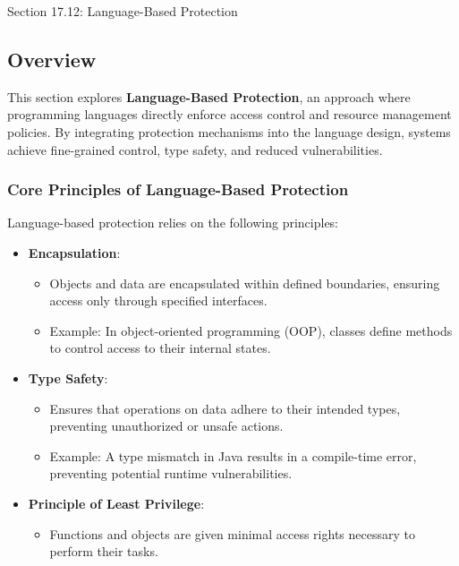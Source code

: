 \begin{notes}{Section 17.12: Language-Based Protection}
    \subsection*{Overview}

    This section explores \textbf{Language-Based Protection}, an approach where programming languages directly enforce access control and resource management policies. By integrating protection 
    mechanisms into the language design, systems achieve fine-grained control, type safety, and reduced vulnerabilities.
    
    \subsubsection*{Core Principles of Language-Based Protection}
    
    Language-based protection relies on the following principles:
    \begin{itemize}
        \item \textbf{Encapsulation}:
        \begin{itemize}
            \item Objects and data are encapsulated within defined boundaries, ensuring access only through specified interfaces.
            \item Example: In object-oriented programming (OOP), classes define methods to control access to their internal states.
        \end{itemize}
        \item \textbf{Type Safety}:
        \begin{itemize}
            \item Ensures that operations on data adhere to their intended types, preventing unauthorized or unsafe actions.
            \item Example: A type mismatch in Java results in a compile-time error, preventing potential runtime vulnerabilities.
        \end{itemize}
        \item \textbf{Principle of Least Privilege}:
        \begin{itemize}
            \item Functions and objects are given minimal access rights necessary to perform their tasks.
        \end{itemize}
    \end{itemize}
    

\end{notes}
